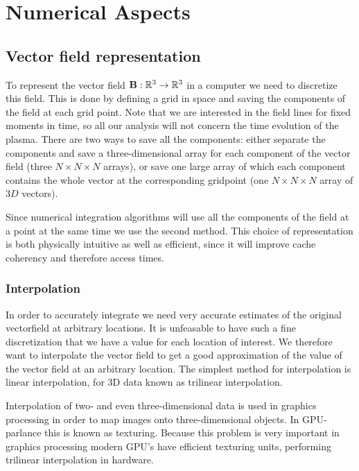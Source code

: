 \documentclass{article}
\renewcommand{\vec}{\bold}
\begin{document}
\section{Numerical Aspects}
\subsection{Vector field representation}
To represent the vector field $\vec{B}: \mathbb{R}^3 \to \mathbb{R}^3$ in a computer we need to discretize this field. 
This is done by defining a grid in space and saving the components of the field at each grid point. 
Note that we are interested in the field lines for fixed moments in time, so all our analysis will not concern the time evolution of the plasma. 
There are two ways to save all the components: either separate the components and save a three-dimensional array for each component of the vector field (three $N\times N\times N$ arrays), or save one large array of which each component contains the whole vector at the corresponding gridpoint (one $N\times N\times N$ array of $3D$ vectors).

Since numerical integration algorithms will use all the components of the field at a point at the same time we use the second method. %
This choice of representation is both physically intuitive as well as efficient, since it will improve cache coherency and therefore access times.

\subsubsection{Interpolation}
In order to accurately integrate we need very accurate estimates of the original vectorfield at arbitrary locations. 
It is unfeasable to have such a fine discretization that we have a value for each location of interest. 
We therefore want to interpolate the vector field to get a good approximation of the value of the vector field at an arbitrary location.
The simplest method for interpolation is linear interpolation, for 3D data known as trilinear interpolation.

Interpolation of two- and even three-dimensional data is used in graphics processing in order to map images onto three-dimensional objects. 
In GPU-parlance this is known as texturing. Because this problem is very important in graphics processing modern GPU's have efficient texturing units, performing trilinear interpolation in hardware.
\end{document}
